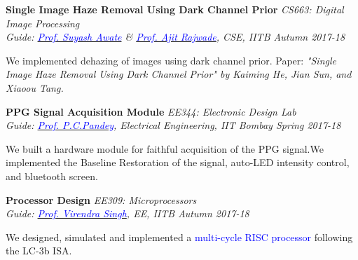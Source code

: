 \documentclass[margin,line, 9pt]{res}
\newenvironment{list1}{
  \begin{list}{\ding{113}}{%
      \setlength{\itemsep}{0in}
      \setlength{\parsep}{0in} \setlength{\parskip}{0in}
      \setlength{\topsep}{0in} \setlength{\partopsep}{0in} 
      \setlength{\leftmargin}{0.17in}}}{\end{list}}
\begin{document}
\begin{resume}
\begin{list1}
\end{list1}
% 
% 
% 
% 
{\bf Single Image Haze Removal Using Dark Channel Prior} \hfill \textit{CS663: Digital Image Processing} \\
{\em Guide: \href{https://www.cse.iitb.ac.in/~suyash}{\textcolor{blue}{Prof. Suyash Awate}} \& \href{https://www.cse.iitb.ac.in/~ajitvr}{\textcolor{blue}{Prof. Ajit Rajwade}}, CSE, IITB \hfill Autumn 2017-18} \\
\vspace*{-.15in}
\begin{list1}
\item[] We implemented dehazing of images using dark channel prior. Paper: \textit{"Single Image Haze Removal Using Dark Channel Prior" by Kaiming He, Jian Sun, and Xiaoou Tang.} 
\end{list1}
% 
% 
{\bf PPG Signal Acquisition Module} \hfill \textit{EE344: Electronic Design Lab} \\
{\em Guide: \href{https://www.ee.iitb.ac.in/~pcpandey/}{\textcolor{blue}{Prof. P.C.Pandey}}, Electrical Engineering, IIT Bombay \hfill Spring 2017-18} \\
\vspace*{-.15in}
\begin{list1}
\item[] We built a hardware module for faithful acquisition of the PPG signal.We implemented the Baseline Restoration of the signal, auto-LED intensity control, and bluetooth screen.
\end{list1}
% 
% 
{\bf Processor Design} \hfill \textit{EE309: Microprocessors} \\
{\em Guide: \href{https://www.ee.iitb.ac.in/~viren/}{\textcolor{blue}{Prof. Virendra Singh}}, EE, IITB \hfill Autumn 2017-18} \\
\vspace*{-.15in}
\begin{list1}
\item[] We designed, simulated and implemented a {\textcolor{blue} {multi-cycle RISC processor}} following the LC-3b ISA.
\end{list1}
% 
% 
% 

\end{resume}
\end{document}
